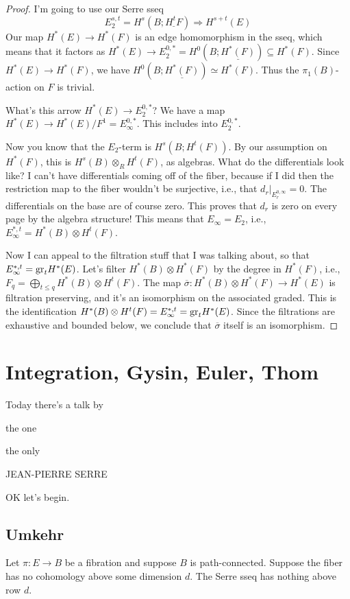\begin{proof}
    I'm going to use our Serre sseq
    $$
    E^{s,t}_2 = H^s(B;\underline{H^t F}) \Rightarrow H^{s+t}(E)
    $$
    Our map $H^\ast(E)\to H^\ast(F)$ is an edge homomorphism in the sseq, which means that it factors as $H^\ast(E)\to E^{0,\ast}_2 = H^0(B;\underline{H^\ast(F)}) \subseteq H^\ast(F)$.
    Since $H^\ast(E)\to H^\ast(F)$, we have $H^0(B;\underline{H^\ast(F)}) \simeq H^\ast(F)$.
    Thus the $\pi_1(B)$-action on $F$ is trivial.
    \begin{question}
	What's this arrow $H^\ast(E)\to E^{0,\ast}_2$?
	We have a map $H^\ast(E)\to H^\ast(E)/F^1 = E^{0,\ast}_\infty$.
	This includes into $E^{0,\ast}_2$.
    \end{question}
    Now you know that the $E_2$-term is $H^s(B;H^t(F))$.
    By our assumption on $H^\ast(F)$, this is $H^s(B)\otimes_R H^t(F)$, as algebras.
    What do the differentials look like?
    I can't have differentials coming off of the fiber, because if I did then the restriction map to the fiber wouldn't be surjective, i.e., that $d_r|_{E^{0,\infty}_r} = 0$.
    The differentials on the base are of course zero.
    This proves that $d_r$ is zero on every page by the algebra structure!
    This means that $E_\infty = E_2$, i.e., $E_\infty^{\ast,t} = H^\ast(B)\otimes H^t(F)$.

    Now I can appeal to the filtration stuff that I was talking about, so that $E^{\ast,t}_\infty = \mathrm{gr}_t H^\ast(E)$.
    Let's filter $H^\ast(B)\otimes H^\ast(F)$ by the degree in $H^\ast(F)$, i.e., $F_q = \bigoplus_{t\leq q} H^\ast(B)\otimes H^t(F)$.
    The map $\overline{\sigma}:H^\ast(B)\otimes H^\ast(F)\to H^\ast(E)$ is filtration preserving, and it's an isomorphism on the associated graded.
    This is the identification $H^\ast(B)\otimes H^t(F) = E^{\ast,t}_\infty = \mathrm{gr}_t H^\ast(E)$.
    Since the filtrations are exhaustive and bounded below, we conclude that $\overline{\sigma}$ itself is an isomorphism.
\end{proof}
\section{Integration, Gysin, Euler, Thom}
Today
there's a talk by

the
one

the
only

JEAN-PIERRE SERRE

OK let's begin.
\subsection{Umkehr}
Let $\pi:E \to B$ be a fibration and suppose $B$ is path-connected.
Suppose the fiber has no cohomology above some dimension $d$.
The Serre sseq has nothing above row $d$.

